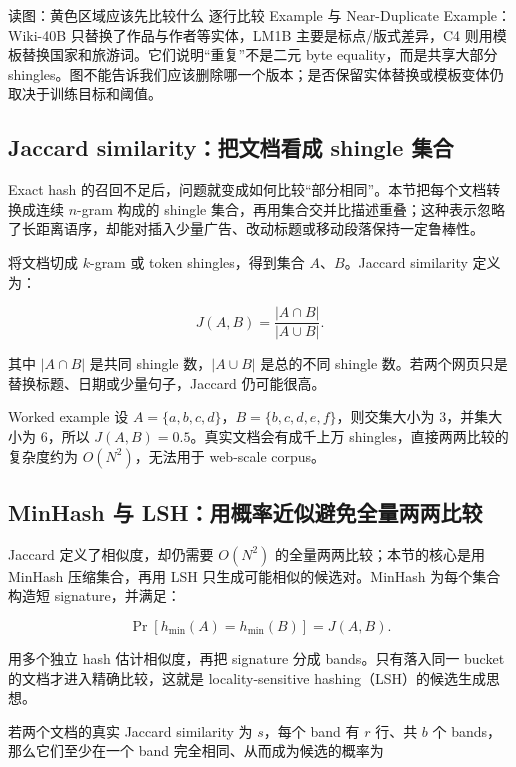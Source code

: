 \begin{knowledgebox}{读图：黄色区域应该先比较什么}
逐行比较 Example 与 Near-Duplicate Example：Wiki-40B 只替换了作品与作者等实体，LM1B 主要是标点/版式差异，C4 则用模板替换国家和旅游词。它们说明“重复”不是二元 byte equality，而是共享大部分 shingles。图不能告诉我们应该删除哪一个版本；是否保留实体替换或模板变体仍取决于训练目标和阈值。
\end{knowledgebox}

\subsection{Jaccard similarity：把文档看成 shingle 集合}

Exact hash 的召回不足后，问题就变成如何比较“部分相同”。本节把每个文档转换成连续 $n$-gram 构成的 shingle 集合，再用集合交并比描述重叠；这种表示忽略了长距离语序，却能对插入少量广告、改动标题或移动段落保持一定鲁棒性。

将文档切成 $k$-gram 或 token shingles，得到集合 $A$、$B$。Jaccard similarity 定义为：

$$
J(A,B)=\frac{|A\cap B|}{|A\cup B|}.
$$

其中 $|A\cap B|$ 是共同 shingle 数，$|A\cup B|$ 是总的不同 shingle 数。若两个网页只是替换标题、日期或少量句子，Jaccard 仍可能很高。

\begin{knowledgebox}{Worked example}
设 $A=\{a,b,c,d\}$，$B=\{b,c,d,e,f\}$，则交集大小为 3，并集大小为 6，所以 $J(A,B)=0.5$。真实文档会有成千上万 shingles，直接两两比较的复杂度约为 $O(N^2)$，无法用于 web-scale corpus。
\end{knowledgebox}

\subsection{MinHash 与 LSH：用概率近似避免全量两两比较}

Jaccard 定义了相似度，却仍需要 $O(N^2)$ 的全量两两比较；本节的核心是用 MinHash 压缩集合，再用 LSH 只生成可能相似的候选对。MinHash 为每个集合构造短 signature，并满足：

$$
\Pr[h_{\min}(A)=h_{\min}(B)] = J(A,B).
$$

用多个独立 hash 估计相似度，再把 signature 分成 bands。只有落入同一 bucket 的文档才进入精确比较，这就是 locality-sensitive hashing（LSH）的候选生成思想。

若两个文档的真实 Jaccard similarity 为 $s$，每个 band 有 $r$ 行、共 $b$ 个 bands，那么它们至少在一个 band 完全相同、从而成为候选的概率为

